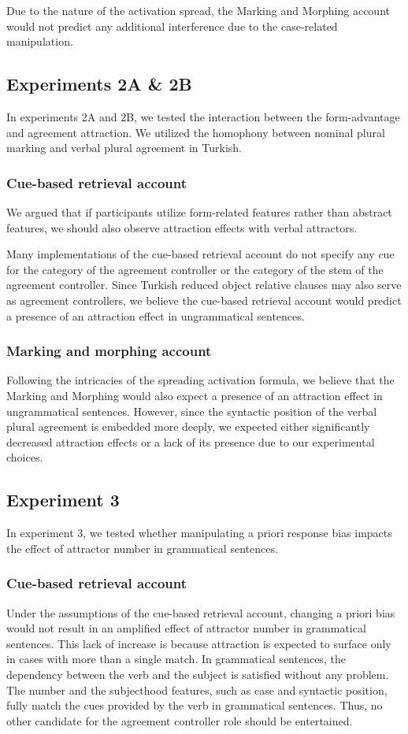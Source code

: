 Due to the nature of the activation spread, the Marking and Morphing account would not predict any additional interference due to the case-related manipulation. 

\subsection{Experiments 2A \& 2B}
In experiments 2A and 2B, we tested the interaction between the form-advantage and agreement attraction. We utilized the homophony between nominal plural marking and verbal plural agreement in Turkish. 

\subsubsection{Cue-based retrieval account}
We argued that if participants utilize form-related features rather than abstract features, we should also observe attraction effects with verbal attractors. 

Many implementations of the cue-based retrieval account do not specify any cue for the category of the agreement controller or the category of the stem of the agreement controller. Since Turkish reduced object relative clauses may also serve as agreement controllers, we believe the cue-based retrieval account would predict a presence of an attraction effect in ungrammatical sentences. 

\subsubsection{Marking and morphing account}

Following the intricacies of the spreading activation formula, we believe that the Marking and Morphing would also expect a presence of an attraction effect in ungrammatical sentences. However, since the syntactic position of the verbal plural agreement is embedded more deeply, we expected either significantly decreased attraction effects or a lack of its presence due to our experimental choices.   

\subsection{Experiment 3}
In experiment 3, we tested whether manipulating a priori response bias impacts the effect of attractor number in grammatical sentences. 

\subsubsection{Cue-based retrieval account}
Under the assumptions of the cue-based retrieval account, changing a priori bias would not result in an amplified effect of attractor number in grammatical sentences. This lack of increase is because attraction is expected to surface only in cases with more than a single match. In grammatical sentences, the dependency between the verb and the subject is satisfied without any problem. The number and the subjecthood features, such as case and syntactic position, fully match the cues provided by the verb in grammatical sentences. Thus, no other candidate for the agreement controller role should be entertained.


